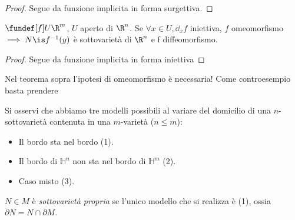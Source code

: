 \begin{proof}
 Segue da funzione implicita in forma surgettiva.
\end{proof}
\begin{prop}
 $\fundef[f] U\R^m$, $U$ aperto di $\R^n$. Se $\forall x \in U, \dd_xf$ iniettiva, $f$ omeomorfismo$\implies N\is f^{-1}(y)$ è sottovarietà di $\R^n$ e f diffeomorfismo.
\end{prop}
\begin{proof}
 Segue da funzione implicita in forma iniettiva
\end{proof}
\begin{oss}
 Nel teorema sopra l'ipotesi di omeomorfismo è necessaria!
 Come controesempio basta prendere 
\end{oss}
Si osservi che abbiamo tre modelli possibili al variare del domicilio di una  $n$-sottovarietà contenuta in una $m$-varietà ($n\le m$):
\begin{itemize}
 \item Il bordo sta nel bordo (1).
 \item Il bordo di $\mathbb H^n$ non sta nel bordo di $\mathbb H^m$ (2).
 \item Caso misto (3).
\end{itemize}

\begin{defn}
 $N\in M$ è \emph{sottovarietà propria} se l'unico modello che si realizza è (1), ossia $\partial N = N\cap \partial M$.

\end{defn}
